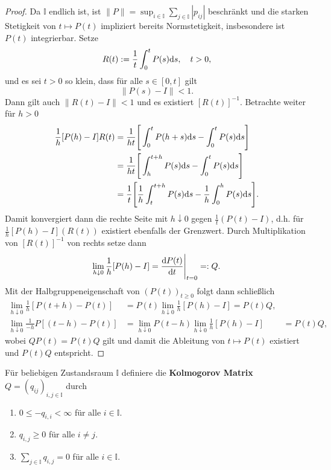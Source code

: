 \begin{proof}
Da $\mathbb I$ endlich ist, ist $\|P\|=\sup_{i\in\mathbb I}\sum_{j\in\mathbb I}|p_{ij}|$ beschränkt und  die starken Stetigkeit von $t\mapsto P(t)$ impliziert bereits Normstetigkeit, insbesondere ist $P(t)$ integrierbar. Setze $$R(t):=\frac{1}{t}\int_0^t P(s)\text ds, \quad t>0,$$ und es sei $t>0$ so klein, dass für alle $s\in[0,t]$ gilt $$\|P(s)-I\|< 1.$$Dann gilt auch $\|R(t)-I\|< 1$ und es existiert $[R(t)]^{-1}$. Betrachte weiter für $h>0$ 
\begin{align}
\frac{1}{h}[P(h)-I]R(t)
&=\frac{1}{ht}\Bigg[\int_0^t P(h+s)\text ds-\int_0^t P(s)\text ds\Bigg]\\
&=\frac{1}{ht}\Bigg[\int_h^{t+h}P(s)\text ds-\int_0^t P(s)\text ds\Bigg]\\
&=\frac{1}{t}\Bigg[\frac{1}{h}\int_t^{t+h}P(s)\text ds-\frac{1}{h}\int_0^h P(s)\text ds\Bigg].
\end{align}
Damit konvergiert dann die rechte Seite mit $h\downarrow 0$ gegen $\frac{1}{t}(P(t)-I)$, d.h. für $\frac{1}{h}[P(h)-I](R(t))$ existiert ebenfalls der Grenzwert. Durch Multiplikation von $[R(t)]^{-1}$ von rechts setze dann $$\lim_{h\downarrow 0}\frac{1}{h}[P(h)-I]=\frac{\text d P(t)}{\text d t}\Bigg|_{t=0}=:Q.$$
Mit der Halbgruppeneigenschaft von $(P(t))_{t\geq0}$  folgt dann schließlich 
\begin{align}
\lim_{h\downarrow 0}\frac{1}{h}[P(t+h)-P(t)]
&=P(t)\lim_{h\downarrow 0}\frac{1}{h}[P(h)-I]=P(t)Q,\\
\lim_{h\downarrow 0}\frac{1}{-h}P[(t-h)-P(t)]
&=\lim_{h\downarrow 0}P(t-h)\lim_{h\downarrow 0}\frac{1}{h}[P(h)-I]
&=P(t)Q,\end{align} wobei $QP(t)=P(t)Q$ gilt und damit die Ableitung von $t\mapsto P(t)$ existiert und $P(t)Q$ entspricht.
\end{proof}

\begin{defi}
  Für beliebigen Zustandsraum $\mathbb I$ definiere die \textbf{Kolmogorov Matrix} $Q=(q_{ij})_{i,j\in\mathbb I}$ durch
  \begin{enumerate}
      \item $0\leq -q_{i,i}< \infty$ für alle $i\in\mathbb I$.
      \item $q_{i,j}\geq0$ für alle $i\neq j$.
      \item $\sum_{j\in\mathbb I}q_{i,j}=0$ für alle $i\in \mathbb I$.
  \end{enumerate}
\end{defi}

